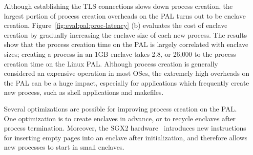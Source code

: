 Although establishing the TLS connections slows down
process creation,
the largest portion of process creation overheads
on the \sgx{} PAL
turns out to be enclave creation.
Figure~\ref{fig:eval:pal:proc-latency} (b)
evaluates the cost of enclave creation
by gradually increasing the enclave size of each new process.
The results show that
the process creation time on the \sgx{} PAL
is largely correlated with
enclave sizes;
creating a process in an 1GB enclave
takes \roughly{}2.8\asec{},
or 26,000\x{} to the process creation time
on the Linux PAL.
Although process creation
is generally considered an expensive operation
in most OSes,
the extremely high overheads
on the \sgx{} PAL
can be a huge impact, especially for applications which
frequently create new process, such as shell applications and makefiles.


Several optimizations are possible for improving process creation
on the \sgx{} PAL.
One optimization
is to create enclaves in advance,
or to recycle enclaves after process termination.
Moreover,
the SGX2 hardware~\cite{sgx2} introduces
new instructions for inserting empty pages into an enclave
after initialization,
and therefore allows new processes to start
in small enclaves.






